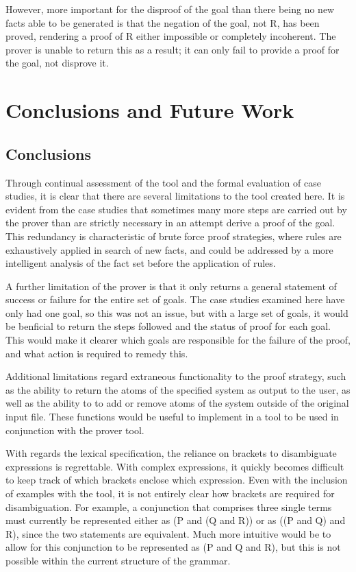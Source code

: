 \documentclass{l4proj}
\begin{document}
However, more important for the disproof of the goal than there being no new facts able to be generated is that the negation of the goal, not R, has been proved, rendering a proof of R either impossible or completely incoherent. The prover is unable to return this as a result; it can only fail to provide a proof for the goal, not disprove it. 

\chapter{Conclusions and Future Work}

\section{Conclusions}
Through continual assessment of the tool and the formal evaluation of case studies, it is clear that there are several limitations to the tool created here. It is evident from the case studies that sometimes many more steps are carried out by the prover than are strictly necessary in an attempt derive a proof of the goal. This redundancy is characteristic of brute force proof strategies, where rules are exhaustively applied in search of new facts, and could be addressed by a more intelligent analysis of the fact set before the application of rules. 

A further limitation of the prover is that it only returns a general statement of success or failure for the entire set of goals. The case studies examined here have only had one goal, so this was not an issue, but with a large set of goals, it would be benficial to return the steps followed and the status of proof for each goal. This would make it clearer which goals are responsible for the failure of the proof, and what action is required to remedy this. 

Additional limitations regard extraneous functionality to the proof strategy, such as the ability to return the atoms of the specified system as output to the user, as well as the ability to to add or remove atoms of the system outside of the original input file. These functions would be useful to implement in a tool to be used in conjunction with the prover tool. 

With regards the lexical specification, the reliance on brackets to disambiguate expressions is regrettable. With complex expressions, it quickly becomes difficult to keep track of which brackets enclose which expression. Even with the inclusion of examples with the tool, it is not entirely clear how brackets are required for disambiguation. For example, a conjunction that comprises three single terms must currently be represented either as (P and (Q and R)) or as ((P and Q) and R), since the two statements are equivalent. Much more intuitive would be to allow for this conjunction to be represented as (P and Q and R), but this is not possible within the current structure of the grammar. 
\end{document}
